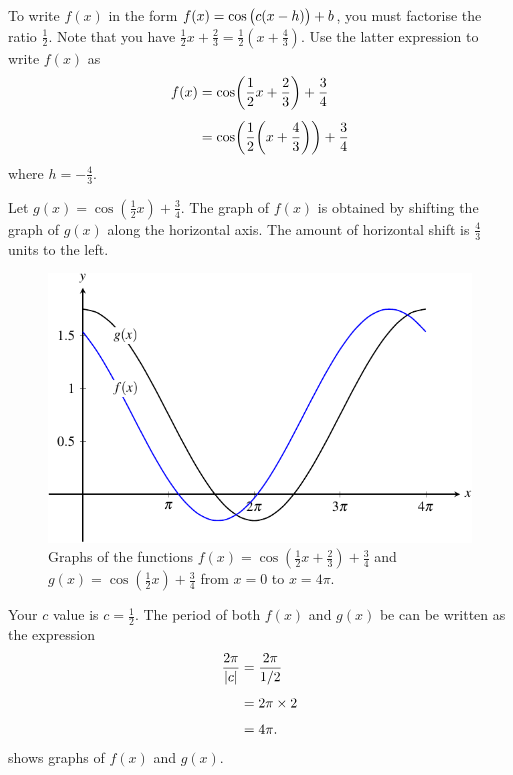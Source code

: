 \documentclass[a4paper,oneside,12pt]{article}
\begin{document}
\begin{solution}
To write $f(x)$ in the form $f(x) = \cos\big(c(x - h)\big) + b$, you
must factorise the ratio $\frac{1}{2}$.  Note that you have
$\frac{1}{2} x + \frac{2}{3} = \frac{1}{2} (x + \frac{4}{3})$.  Use
the latter expression to write $f(x)$ as
\begin{align*}
f(x)
&=
\cosp{\frac{1}{2} x + \frac{2}{3}} + \frac{3}{4} \\[4pt]
&=
\cosp{\frac{1}{2} \parenthesis*{x + \frac{4}{3}}} + \frac{3}{4}
\end{align*}
where $h = -\frac{4}{3}$.

Let $g(x) = \cos(\frac{1}{2} x) + \frac{3}{4}$.  The graph of $f(x)$
is obtained by shifting the graph of $g(x)$ along the horizontal axis.
The amount of horizontal shift is $\frac{4}{3}$ units to the left.

\begin{figure}[!htbp]
\centering
\includegraphics[scale=1.1]{image/13/cos-left-shift-4third.pdf}
\caption{%
  Graphs of the functions
  $f(x) = \cos(\frac{1}{2} x + \frac{2}{3}) + \frac{3}{4}$ and
  $g(x) = \cos(\frac{1}{2} x) + \frac{3}{4}$ from $x = 0$ to
  $x = 4\pi$.
}
\label{fig:trigonometric:cos_left_shift_4third}
\end{figure}

Your $c$ value is $c = \frac{1}{2}$.  The period of both $f(x)$ and
$g(x)$ be can be written as the expression
\begin{align*}
\frac{2\pi}{\lvert c\rvert}
&=
\frac{2\pi}{1/2} \\[4pt]
&=
2\pi \times 2 \\[4pt]
&=
4\pi.
\end{align*}
 shows graphs of
$f(x)$ and $g(x)$.
\end{solution}
\end{document}
